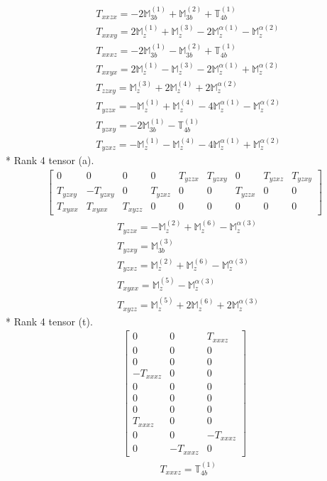 \documentclass[fleqn,8pt,landscape]{jsarticle}
\begin{document}
\begin{align*}
& T_{xxzx} = - 2 \mathbb{M}_{3b}^{(1)} + \mathbb{M}_{3b}^{(2)} + \mathbb{T}_{4b}^{(1)} \\
& T_{xxxy} = 2 \mathbb{M}_{z}^{(1)} + \mathbb{M}_{z}^{(3)} - 2 \mathbb{M}_{z}^{\alpha(1)} - \mathbb{M}_{z}^{\alpha(2)} \\
& T_{xxxz} = - 2 \mathbb{M}_{3b}^{(1)} - \mathbb{M}_{3b}^{(2)} + \mathbb{T}_{4b}^{(1)} \\
& T_{xxyx} = 2 \mathbb{M}_{z}^{(1)} - \mathbb{M}_{z}^{(3)} - 2 \mathbb{M}_{z}^{\alpha(1)} + \mathbb{M}_{z}^{\alpha(2)} \\
& T_{zzxy} = \mathbb{M}_{z}^{(3)} + 2 \mathbb{M}_{z}^{(4)} + 2 \mathbb{M}_{z}^{\alpha(2)} \\
& T_{yzzx} = - \mathbb{M}_{z}^{(1)} + \mathbb{M}_{z}^{(4)} - 4 \mathbb{M}_{z}^{\alpha(1)} - \mathbb{M}_{z}^{\alpha(2)} \\
& T_{yzxy} = - 2 \mathbb{M}_{3b}^{(1)} - \mathbb{T}_{4b}^{(1)} \\
& T_{yzxz} = - \mathbb{M}_{z}^{(1)} - \mathbb{M}_{z}^{(4)} - 4 \mathbb{M}_{z}^{\alpha(1)} + \mathbb{M}_{z}^{\alpha(2)}
\end{align*}
* Rank 4 tensor (a).
\begin{align*}
\begin{bmatrix} 0 & 0 & 0 & 0 & T_{yzzx} & T_{yzxy} & 0 & T_{yzxz} & T_{yzxy} \\ T_{yzxy} & - T_{yzxy} & 0 & T_{yzxz} & 0 & 0 & T_{yzzx} & 0 & 0 \\ T_{xyxx} & T_{xyxx} & T_{xyzz} & 0 & 0 & 0 & 0 & 0 & 0 \end{bmatrix}
\end{align*}
\begin{align*}
& T_{yzzx} = - \mathbb{M}_{z}^{(2)} + \mathbb{M}_{z}^{(6)} - \mathbb{M}_{z}^{\alpha(3)} \\
& T_{yzxy} = \mathbb{M}_{3b}^{(3)} \\
& T_{yzxz} = \mathbb{M}_{z}^{(2)} + \mathbb{M}_{z}^{(6)} - \mathbb{M}_{z}^{\alpha(3)} \\
& T_{xyxx} = \mathbb{M}_{z}^{(5)} - \mathbb{M}_{z}^{\alpha(3)} \\
& T_{xyzz} = \mathbb{M}_{z}^{(5)} + 2 \mathbb{M}_{z}^{(6)} + 2 \mathbb{M}_{z}^{\alpha(3)}
\end{align*}
* Rank 4 tensor (t).
\begin{align*}
\begin{bmatrix} 0 & 0 & T_{xxxz} \\ 0 & 0 & 0 \\ 0 & 0 & 0 \\ - T_{xxxz} & 0 & 0 \\ 0 & 0 & 0 \\ 0 & 0 & 0 \\ 0 & 0 & 0 \\ T_{xxxz} & 0 & 0 \\ 0 & 0 & - T_{xxxz} \\ 0 & - T_{xxxz} & 0 \end{bmatrix}
\end{align*}
\begin{align*}
& T_{xxxz} = \mathbb{T}_{4b}^{(1)}
\end{align*}
\end{document}
